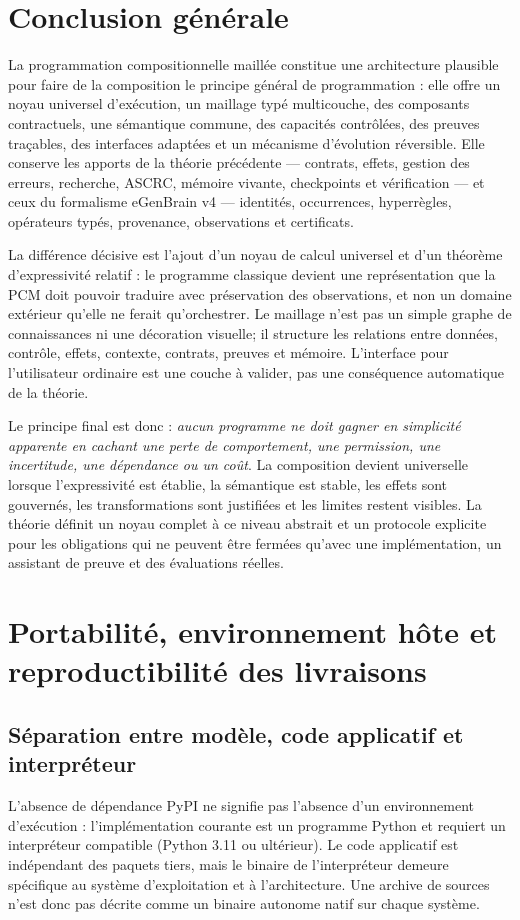 \documentclass[11pt,a4paper,openany]{book}
\theoremstyle{definition}
\theoremstyle{plain}
\theoremstyle{remark}
\begin{document}
\chapter{Conclusion générale}
La programmation compositionnelle maillée constitue une architecture plausible pour faire de la composition le principe général de programmation : elle offre un noyau universel d'exécution, un maillage typé multicouche, des composants contractuels, une sémantique commune, des capacités contrôlées, des preuves traçables, des interfaces adaptées et un mécanisme d'évolution réversible. Elle conserve les apports de la théorie précédente — contrats, effets, gestion des erreurs, recherche, ASCRC, mémoire vivante, checkpoints et vérification — et ceux du formalisme eGenBrain v4 — identités, occurrences, hyperrègles, opérateurs typés, provenance, observations et certificats.

La différence décisive est l'ajout d'un noyau de calcul universel et d'un théorème d'expressivité relatif : le programme classique devient une représentation que la PCM doit pouvoir traduire avec préservation des observations, et non un domaine extérieur qu'elle ne ferait qu'orchestrer. Le maillage n'est pas un simple graphe de connaissances ni une décoration visuelle; il structure les relations entre données, contrôle, effets, contexte, contrats, preuves et mémoire. L'interface pour l'utilisateur ordinaire est une couche à valider, pas une conséquence automatique de la théorie.

Le principe final est donc : \emph{aucun programme ne doit gagner en simplicité apparente en cachant une perte de comportement, une permission, une incertitude, une dépendance ou un coût}. La composition devient universelle lorsque l'expressivité est établie, la sémantique est stable, les effets sont gouvernés, les transformations sont justifiées et les limites restent visibles. La théorie définit un noyau complet à ce niveau abstrait et un protocole explicite pour les obligations qui ne peuvent être fermées qu'avec une implémentation, un assistant de preuve et des évaluations réelles.

\chapter{Portabilité, environnement hôte et reproductibilité des livraisons}
\section{Séparation entre modèle, code applicatif et interpréteur}
L'absence de dépendance PyPI ne signifie pas l'absence d'un environnement d'exécution : l'implémentation courante est un programme Python et requiert un interpréteur compatible (Python 3.11 ou ultérieur). Le code applicatif est indépendant des paquets tiers, mais le binaire de l'interpréteur demeure spécifique au système d'exploitation et à l'architecture. Une archive de sources n'est donc pas décrite comme un binaire autonome natif sur chaque système.
\end{document}
